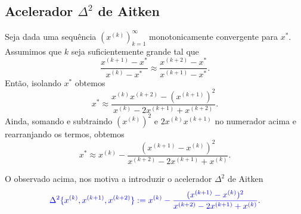 \subsection{Acelerador $\Delta^2$ de Aitken}

Seja dada uma sequência $(x^{(k)})_{k=1}^\infty$ monotonicamente convergente para $x^*$. Assumimos que $k$ seja suficientemente grande tal que
\begin{equation}
  \frac{x^{(k+1)}-x^*}{x^{(k)}-x^*} \approx \frac{x^{(k+2)}-x^*}{x^{(k+1)}-x^*}.
\end{equation}
Então, isolando $x^*$ obtemos
\begin{equation}
  x^* \approx \frac{x^{(k)}x^{(k+2)}-(x^{(k+1)})^2}{x^{(k)}-2x^{(k+1)}+x^{(k+2)}}.
\end{equation}
Ainda, somando e subtraindo $(x^{(k)})^2$ e $2x^{(k)}x^{(k+1)}$ no numerador acima e rearranjando os termos, obtemos
\begin{equation}
  x^* \approx x^{(k)} - \frac{(x^{(k+1)}-x^{(k)})^2}{x^{(k+2)}-2x^{(k+1)}+x^{(k)}}.
\end{equation}

O observado acima, nos motiva a introduzir o acelerador $\Delta^2$ de Aitken
\begin{equation}\label{cap_eq1d_sec_Steffensen:eq:ac_aitken}
  {\color{blue}\Delta^2\{x^{(k)},x^{(k+1)},x^{(k+2)}\} := x^{(k)} - \frac{(x^{(k+1)}-x^{(k)})^2}{x^{(k+2)}-2x^{(k+1)}+x^{(k)}}}.
\end{equation}


